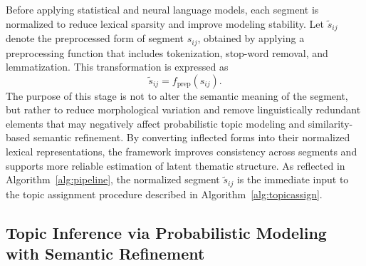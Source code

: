 \documentclass[final,1p,times]{elsarticle}
\begin{document}
Before applying statistical and neural language models, each segment is normalized to reduce lexical sparsity and improve modeling stability. Let $\tilde{s}_{ij}$ denote the preprocessed form of segment $s_{ij}$, obtained by applying a preprocessing function that includes tokenization, stop-word removal, and lemmatization. This transformation is expressed as
\begin{equation}
\tilde{s}_{ij} = f_{\mathrm{prep}}(s_{ij}).
\end{equation}
The purpose of this stage is not to alter the semantic meaning of the segment, but rather to reduce morphological variation and remove linguistically redundant elements that may negatively affect probabilistic topic modeling and similarity-based semantic refinement. By converting inflected forms into their normalized lexical representations, the framework improves consistency across segments and supports more reliable estimation of latent thematic structure. As reflected in Algorithm~\ref{alg:pipeline}, the normalized segment $\tilde{s}_{ij}$ is the immediate input to the topic assignment procedure described in Algorithm~\ref{alg:topicassign}.

\subsection{Topic Inference via Probabilistic Modeling with Semantic Refinement}
\end{document}
